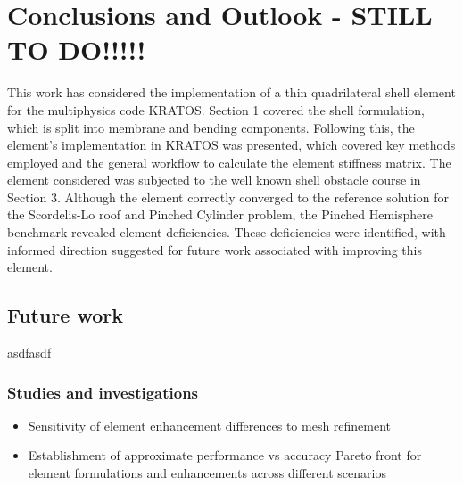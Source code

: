 
\chapter{Conclusions and Outlook - STILL TO DO!!!!!}
\label{chap:conclusions}
\renewcommand{\Thema}{Conclusion}

This work has considered the implementation of a thin quadrilateral shell element for the multiphysics code KRATOS. Section 1 covered the shell formulation, which is split into membrane and bending components. Following this, the element's implementation in KRATOS was presented, which covered key methods employed and the general workflow to calculate the element stiffness matrix. The element considered was subjected to the well known shell obstacle course in Section 3. Although the element correctly converged to the reference solution for the Scordelis-Lo roof and Pinched Cylinder problem, the Pinched Hemisphere benchmark revealed element deficiencies. These deficiencies were identified, with informed direction suggested  for future work associated with improving this element. 

\section{Future work}
asdfasdf
\subsection{Studies and investigations}
\begin{itemize}
	\item Sensitivity of element enhancement differences to mesh refinement
	\item Establishment of approximate performance vs accuracy Pareto front for element formulations and enhancements across different scenarios
\end{itemize}


